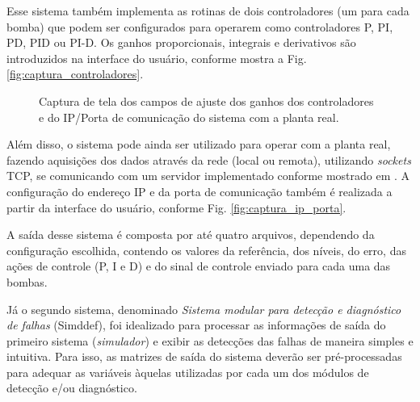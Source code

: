 Esse sistema também implementa as rotinas de dois controladores (um para cada
bomba) que podem ser configurados para operarem como controladores P, PI, PD,
PID ou PI-D. Os ganhos proporcionais, integrais e derivativos são introduzidos
na interface do usuário, conforme mostra a Fig. \ref{fig:captura_controladores}.

\begin{figure}[htb]
\centering
{}
\caption{Captura de tela dos campos de ajuste dos ganhos dos controladores e do
         IP/Porta de comunicação do sistema com a planta real.}
\end{figure}

Além disso, o sistema pode ainda ser utilizado para operar com a planta real,
fazendo aquisições dos dados através da rede (local ou remota), utilizando {\it
sockets} TCP, se comunicando com um servidor implementado conforme mostrado em
. A configuração do endereço IP e da porta de
comunicação também é realizada a partir da interface do usuário, conforme Fig.
\ref{fig:captura_ip_porta}.

A saída desse sistema é composta por até quatro arquivos, dependendo da
configuração escolhida, contendo os valores da referência, dos níveis, do erro,
das ações de controle (P, I e D) e do sinal de controle enviado para cada uma
das bombas.

Já o segundo sistema, denominado {\it Sistema modular para detecção e
diagnóstico de falhas} (Simddef), foi idealizado para processar as informações
de saída do primeiro sistema ({\it simulador}) e exibir as detecções das falhas
de maneira simples e intuitiva. Para isso, as matrizes de saída do sistema
deverão ser pré-processadas para adequar as variáveis àquelas utilizadas por
cada um dos módulos de detecção e/ou diagnóstico.

